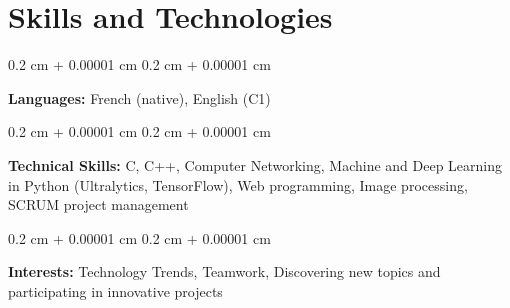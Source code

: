 \documentclass[10pt, letterpaper]{article}
\newenvironment{onecolentry}{
    \begin{adjustwidth}{
        0.2 cm + 0.00001 cm
    }{
        0.2 cm + 0.00001 cm
    }
}{
    \end{adjustwidth}
} %
\begin{document}
	
    \section{Skills and Technologies}
        \begin{onecolentry}
            \textbf{Languages:} French (native), English (C1)
        \end{onecolentry}

        \vspace{0.2 cm}

        \begin{onecolentry}
            \textbf{Technical Skills:} C, C++, Computer Networking, Machine and Deep Learning in Python (Ultralytics, TensorFlow), Web programming, Image processing, SCRUM project management
        \end{onecolentry}

		\vspace{0.2 cm}

        \begin{onecolentry}
            \textbf{Interests:} Technology Trends, Teamwork, Discovering new topics and participating in innovative projects
        \end{onecolentry}
\end{document}
